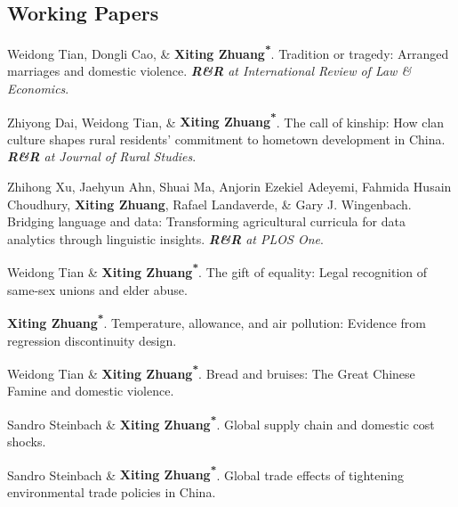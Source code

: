 \documentclass[10.5pt,letterpaper]{article}
\newcommand{\corrauthor}{\textsuperscript{*}}
\renewenvironment{itemize}{
	\begin{list}{}{
			\setlength{\leftmargin}{1.5em}
		}
	}{
	\end{list}
}
\begin{document}
	
	\subsection*{\textbf{Working Papers}}
	\begin{itemize}
		

		
		\item[-] Weidong Tian, Dongli Cao, \& \textbf{Xiting Zhuang\corrauthor}. Tradition or tragedy: Arranged marriages and domestic violence. \emph{\textbf{R\&R} at \textit{International Review of Law \& Economics}}.
		
		\item[-] Zhiyong Dai, Weidong Tian, \& \textbf{Xiting Zhuang\corrauthor}. The call of kinship: How clan culture shapes rural residents' commitment to hometown development in China. \emph{\textbf{R\&R} at \textit{Journal of Rural Studies}}.
		
		\item[-] Zhihong Xu, Jaehyun Ahn, Shuai Ma, Anjorin Ezekiel Adeyemi, Fahmida Husain Choudhury, \textbf{Xiting Zhuang}, Rafael Landaverde, \& Gary J. Wingenbach. Bridging language and data: Transforming agricultural curricula for data analytics through linguistic insights. \emph{\textbf{R\&R} at \textit{PLOS One}}.
		
		\item[-] Weidong Tian \& \textbf{Xiting Zhuang\corrauthor}. The gift of equality: Legal recognition of same-sex unions and elder abuse.  
		
 
		
		\item[-] \textbf{Xiting Zhuang\corrauthor}. Temperature, allowance, and air pollution: Evidence from regression discontinuity design.
		
		\item[-] Weidong Tian \& \textbf{Xiting Zhuang\corrauthor}. Bread and bruises: The Great Chinese Famine and domestic violence.
		
		\item[-] Sandro Steinbach \& \textbf{Xiting Zhuang\corrauthor}. Global supply chain and domestic cost shocks.
		
		\item[-] Sandro Steinbach \& \textbf{Xiting Zhuang\corrauthor}. Global trade effects of tightening environmental trade policies in China.
	\end{itemize}
	
	
\end{document}
